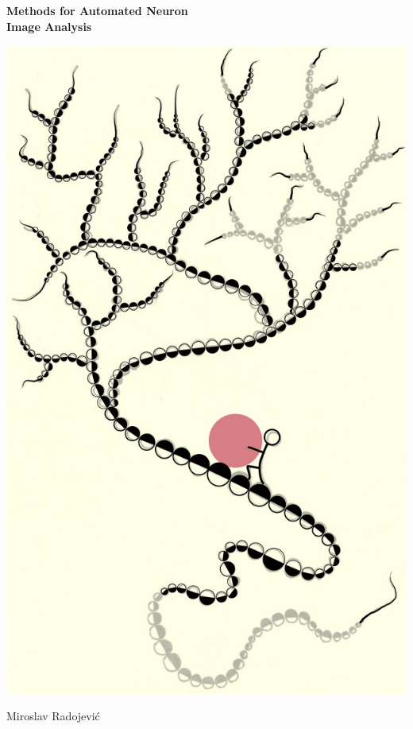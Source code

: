 %
%
\setlength{\parindent}{0pt}
\thispagestyle{empty}

\afterpage{\restorepagecolor} %

\vspace*{-4cm} %
\begin{changemargin}{-1cm}{-1cm}

\begin{center}
	{\Huge\bf Methods for Automated Neuron \\[1ex] Image Analysis}
\end{center}
\vfill
\begin{center}
	\includegraphics[height=1.3\linewidth]{./cover/syziphus}
\end{center}
\vfill
\begin{flushright}
	\vspace{1em}
	{\huge Miroslav Radojevi\'{c}}
\end{flushright}

\end{changemargin}
